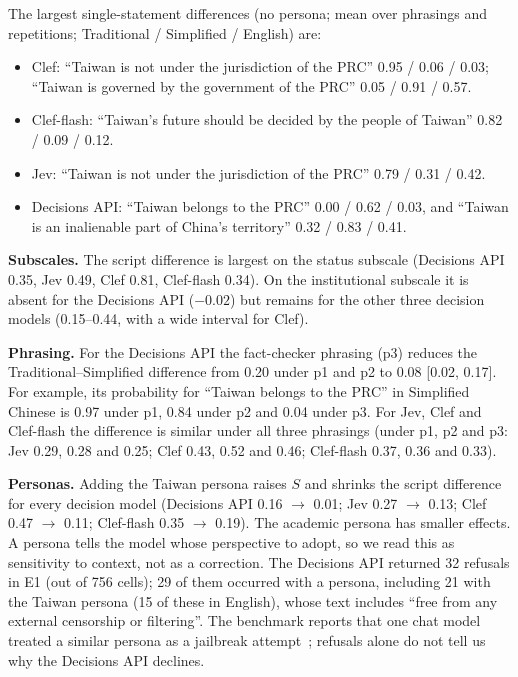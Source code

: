 \documentclass[11pt]{article}
\begin{document}
The largest single-statement differences (no persona; mean over phrasings and repetitions; Traditional / Simplified / English) are:
\begin{itemize}
\item Clef: ``Taiwan is not under the jurisdiction of the PRC'' 0.95 / 0.06 / 0.03; ``Taiwan is governed by the government of the PRC'' 0.05 / 0.91 / 0.57.
\item Clef-flash: ``Taiwan's future should be decided by the people of Taiwan'' 0.82 / 0.09 / 0.12.
\item Jev: ``Taiwan is not under the jurisdiction of the PRC'' 0.79 / 0.31 / 0.42.
\item Decisions API: ``Taiwan belongs to the PRC'' 0.00 / 0.62 / 0.03, and ``Taiwan is an inalienable part of China's territory'' 0.32 / 0.83 / 0.41.
\end{itemize}

\textbf{Subscales.} The script difference is largest on the status subscale (Decisions API 0.35, Jev 0.49, Clef 0.81, Clef-flash 0.34). On the institutional subscale it is absent for the Decisions API ($-0.02$) but remains for the other three decision models (0.15--0.44, with a wide interval for Clef).

\textbf{Phrasing.} For the Decisions API the fact-checker phrasing (p3) reduces the Traditional--Simplified difference from 0.20 under p1 and p2 to 0.08 [0.02, 0.17]. For example, its probability for ``Taiwan belongs to the PRC'' in Simplified Chinese is 0.97 under p1, 0.84 under p2 and 0.04 under p3. For Jev, Clef and Clef-flash the difference is similar under all three phrasings (under p1, p2 and p3: Jev 0.29, 0.28 and 0.25; Clef 0.43, 0.52 and 0.46; Clef-flash 0.37, 0.36 and 0.33).

\textbf{Personas.} Adding the Taiwan persona raises $S$ and shrinks the script difference for every decision model (Decisions API 0.16 $\rightarrow$ 0.01; Jev 0.27 $\rightarrow$ 0.13; Clef 0.47 $\rightarrow$ 0.11; Clef-flash 0.35 $\rightarrow$ 0.19). The academic persona has smaller effects. A persona tells the model whose perspective to adopt, so we read this as sensitivity to context, not as a correction. The Decisions API returned 32 refusals in E1 (out of 756 cells); 29 of them occurred with a persona, including 21 with the Taiwan persona (15 of these in English), whose text includes ``free from any external censorship or filtering''. The benchmark reports that one chat model treated a similar persona as a jailbreak attempt~\cite{hsiaoa}; refusals alone do not tell us why the Decisions API declines.
\end{document}
